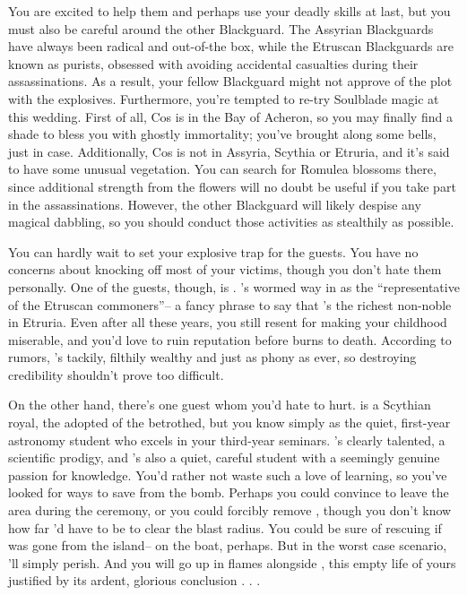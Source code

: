 \documentclass[char]{Kos}
\begin{document}
You are excited to help them and perhaps use your deadly skills at last, but you must also be careful around the other Blackguard. The Assyrian Blackguards have always been radical and out-of-the box, while the Etruscan Blackguards are known as purists, obsessed with avoiding accidental casualties during their assassinations. As a result, your fellow Blackguard might not approve of the plot with the explosives. Furthermore, you’re tempted to re-try Soulblade magic at this wedding. First of all, Cos is in the Bay of Acheron, so you may finally find a shade to bless you with ghostly immortality; you’ve brought along some bells, just in case. Additionally, Cos is not in Assyria, Scythia or Etruria, and it’s said to have some unusual vegetation. You can search for Romulea blossoms there, since additional strength from the flowers will no doubt be useful if you take part in the assassinations. However, the other Blackguard will likely despise any magical dabbling, so you should conduct those activities as stealthily as possible.

You can hardly wait to set your explosive trap for the guests. You have no concerns about knocking off most of your victims, though you don’t hate them personally. One of the guests, though, is \cMerchant{\nickname}. \cMerchant{\They}’s wormed \cMerchant{\their} way in as the “representative of the Etruscan commoners”-- a fancy phrase to say that \cMerchant{\they}’s the richest non-noble in Etruria. Even after all these years, you still resent \cMerchant{\them} for making your childhood miserable, and you’d love to ruin \cMerchant{\their} reputation before \cMerchant{\they} burns to death. According to rumors, \cMerchant{\they}’s tackily, filthily wealthy and just as phony as ever, so destroying \cMerchant{\their} credibility shouldn’t prove too difficult.

On the other hand, there’s one guest whom you’d hate to hurt. \cWard{\nickname} is a Scythian royal, the adopted \cWard{\sibling} of the betrothed, but you know \cWard{\them} simply as the quiet, first-year astronomy student who excels in your third-year seminars. \cWard{\They}’s clearly talented, a scientific prodigy, and \cWard{\they}’s also a quiet, careful student with a seemingly genuine passion for knowledge. You’d rather not waste such a love of learning, so you’ve looked for ways to save \cWard{\them} from the bomb. Perhaps you could convince \cWard{\them} to leave the area during the ceremony, or you could forcibly remove \cWard{\them}, though you don’t know how far \cWard{\they}’d have to be to clear the blast radius. You could be sure of rescuing \cWard{\them} if \cWard{\they} was gone from the island-- on the boat, perhaps. But in the worst case scenario, \cWard{\they}’ll simply perish. And you will go up in flames alongside \cWard{\them}, this empty life of yours justified by its ardent, glorious conclusion . . .
\end{document}
